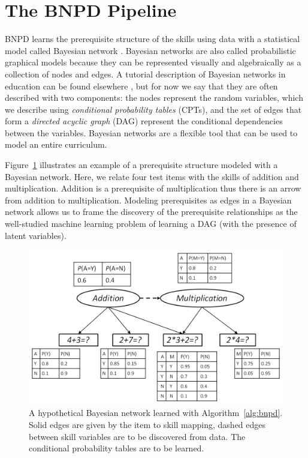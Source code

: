 \documentclass{edm_template}
\begin{document}
\section{The BNPD Pipeline}
\label{sec:pre_pipeline}
BNPD learns the prerequisite structure of the skills using data with a statistical model called Bayesian network \cite{pearl2000causality,spirtes2001causation}.
Bayesian networks are also called probabilistic graphical models  because they can  be represented visually and algebraically as a collection of nodes and edges.
A tutorial description of Bayesian networks in education can be found elsewhere \cite{almond2015bayesian}, 
but for now we say that they are often described with two components: 
the  nodes represent the random variables, which we describe using \textit{conditional probability tables} (CPTs),
and the set of edges that form a \textit{directed acyclic graph} (DAG) represent the conditional dependencies between the variables.
Bayesian networks are a flexible tool that can be used to model an entire curriculum.

Figure~\ref{fig:smexample} illustrates an example of a prerequisite structure modeled with a Bayesian network.
Here, we relate four test items with the skills of addition and multiplication.
Addition is a prerequisite of multiplication thus there is an arrow from addition to multiplication.
Modeling prerequisites as edges in a Bayesian network allows us to frame the discovery of the prerequisite relationships as the well-studied machine learning problem of learning a DAG (with the presence of latent variables).


\begin{figure}
	\begin{center}
		\includegraphics[width=1.0\linewidth]{figures/studentmodel.png}
	\end{center}
	\caption{A hypothetical Bayesian network learned with Algorithm~\ref{alg:bnpd}. 
		Solid edges are given by the item to skill mapping, dashed edges between skill variables are to be discovered from data.
		The conditional probability tables are to be learned.}
	\label{fig:smexample} 
\end{figure} 
\end{document}
